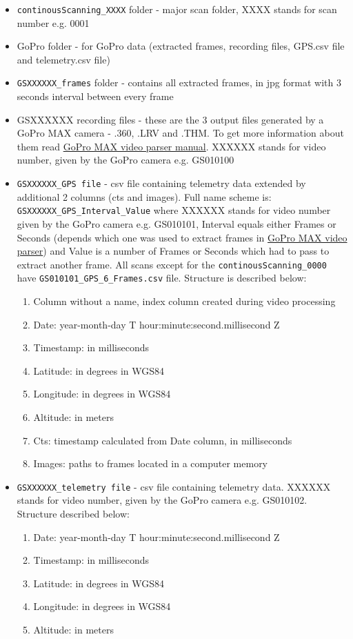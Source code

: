 \documentclass[a4paper,12pt]{article}
\begin{document}
\begin{itemize}
	\item \verb|continousScanning_XXXX| folder - major scan folder, XXXX stands for scan number e.g. 0001
	\item GoPro folder - for GoPro data (extracted frames, recording files, GPS.csv file and telemetry.csv file)
	\item \verb|GSXXXXXX_frames| folder - contains all extracted frames, in jpg format with 3 seconds interval between every frame
	\item GSXXXXXX recording files - these are the 3 output files generated by a GoPro MAX camera - .360, .LRV and .THM. To get more information about them read \href{https://github.com/miloszwojciechowski/Warsaw-model/tree/main/Manuals/GoPro_MAX_video_parser}{GoPro MAX video parser manual}. XXXXXX stands for video number, given by the GoPro camera e.g. GS010100
	\item \verb|GSXXXXXX_GPS file| - csv file containing telemetry data extended by additional 2 columns (cts and images). Full name scheme is: \verb|GSXXXXXX_GPS_Interval_Value| where  XXXXXX stands for video number given by the GoPro camera e.g. GS010101, Interval equals either Frames or Seconds (depends which one was used to extract frames in \href{https://github.com/miloszwojciechowski/Warsaw-model/tree/main/GoPro_MAX_video_parser}{GoPro MAX video parser}) and Value is a number of Frames or Seconds which had to pass to extract another frame. All scans except for the \verb|continousScanning_0000| have \verb|GS010101_GPS_6_Frames.csv| file. Structure is described below:
	\begin{enumerate}
		\item Column without a name, index column created during video processing
		\item Date: year-month-day T hour:minute:second.millisecond Z
		\item Timestamp: in milliseconds
		\item Latitude: in degrees in WGS84
		\item Longitude: in degrees in WGS84
		\item Altitude: in meters
		\item Cts: timestamp calculated from Date column, in milliseconds
		\item Images: paths to frames located in a computer memory
	\end{enumerate}
	\item \verb|GSXXXXXX_telemetry file| - csv file containing telemetry data.  XXXXXX stands for video number, given by the GoPro camera e.g. GS010102. Structure described below:
	\begin{enumerate}
		\item Date: year-month-day T hour:minute:second.millisecond Z
		\item Timestamp: in milliseconds
		\item Latitude: in degrees in WGS84
		\item Longitude: in degrees in WGS84
		\item Altitude: in meters
	\end{enumerate}
\end{itemize}
\end{document}
